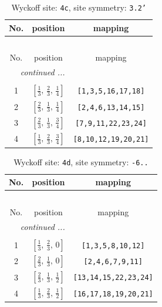 \documentclass[fleqn,8pt]{jsarticle}
\begin{document}
\renewcommand{\arraystretch}{1.2}
\begin{longtable}{ccc}
\caption{Wyckoff site: {\tt 4c}, site symmetry: {\tt 3.2'}}
 \\
 \hline \hline
No. & position & mapping \\ \hline \endfirsthead

\multicolumn{2}{l}{\tablename\ \thetable{}} \\
 \hline \hline
No. & position & mapping \\ \hline \endhead

 \hline \hline
\multicolumn{2}{r}{\footnotesize\it continued ...} \\ \endfoot

 \hline \hline
\multicolumn{2}{r}{} \\ \endlastfoot

1 & $\left[ \frac{1}{3},\, \frac{2}{3},\, \frac{1}{4} \right]$ & {\tt [1,3,5,16,17,18]} \\ \hline
2 & $\left[ \frac{2}{3},\, \frac{1}{3},\, \frac{1}{4} \right]$ & {\tt [2,4,6,13,14,15]} \\ \hline
3 & $\left[ \frac{2}{3},\, \frac{1}{3},\, \frac{3}{4} \right]$ & {\tt [7,9,11,22,23,24]} \\ \hline
4 & $\left[ \frac{1}{3},\, \frac{2}{3},\, \frac{3}{4} \right]$ & {\tt [8,10,12,19,20,21]} \\
\end{longtable}
\renewcommand{\arraystretch}{1.2}
\begin{longtable}{ccc}
\caption{Wyckoff site: {\tt 4d}, site symmetry: {\tt -6..}}
 \\
 \hline \hline
No. & position & mapping \\ \hline \endfirsthead

\multicolumn{2}{l}{\tablename\ \thetable{}} \\
 \hline \hline
No. & position & mapping \\ \hline \endhead

 \hline \hline
\multicolumn{2}{r}{\footnotesize\it continued ...} \\ \endfoot

 \hline \hline
\multicolumn{2}{r}{} \\ \endlastfoot

1 & $\left[ \frac{1}{3},\, \frac{2}{3},\, 0 \right]$ & {\tt [1,3,5,8,10,12]} \\ \hline
2 & $\left[ \frac{2}{3},\, \frac{1}{3},\, 0 \right]$ & {\tt [2,4,6,7,9,11]} \\ \hline
3 & $\left[ \frac{2}{3},\, \frac{1}{3},\, \frac{1}{2} \right]$ & {\tt [13,14,15,22,23,24]} \\ \hline
4 & $\left[ \frac{1}{3},\, \frac{2}{3},\, \frac{1}{2} \right]$ & {\tt [16,17,18,19,20,21]} \\
\end{longtable}
\end{document}
